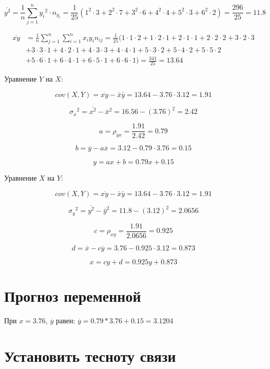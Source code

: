 $$\overline{y^2} = \frac{1}{n} \sum^{n}_{j=1}{{y_i}^2 \cdot n_{y_i}} = \frac{1}{25} (1^2 \cdot 3 + 2^2 \cdot 7 + 3^2 \cdot 6 + 4^2 \cdot 4 + 5^2 \cdot 3 + 6^2 \cdot 2) = \frac{296}{25} = 11.8$$

\begin{align*}
     \overline{xy} &= \frac{1}{n} \sum^{n}_{j=1} \sum^{n}_{i=1} x_i y_i n_{ij} = \frac{1}{25} (1 \cdot 1 \cdot 2 + 1 \cdot 2 \cdot 1 + 2 \cdot 1 \cdot 1 + 2 \cdot 2 \cdot 2 + 3 \cdot 2 \cdot 3 \nonumber \\
    &+ 3 \cdot 3 \cdot 1 + 4 \cdot 2 \cdot 1 + 4 \cdot 3 \cdot 3 + 4 \cdot 4 \cdot 1 + 5 \cdot 3 \cdot 2 + 5 \cdot 4 \cdot 2 + 5 \cdot 5 \cdot 2 \nonumber \\
    &+ 5 \cdot 6 \cdot 1 + 6 \cdot 4 \cdot 1 + 6 \cdot 5 \cdot 1 + 6 \cdot 6 \cdot 1) = \frac{341}{25} = 13.64
\end{align*}

Уравнение $Y$ на $X$:

$$cov(X, Y) = \overline{xy} - \bar{x} \bar{y} = 13.64 - 3.76 \cdot 3.12 = 1.91$$

$${\sigma_x}^2 = \overline{x^2} - \bar{x}^2 = 16.56 - (3.76)^2 = 2.42$$

$$a = \rho_{yx} = \frac{1.91}{2.42} = 0.79$$

$$b = \overline{y} - a \overline{x} = 3.12 - 0.79 \cdot 3.76 = 0.15$$

$$y = ax + b = 0.79x + 0.15$$

Уравнение $X$ на $Y$:

$$cov(X, Y) = \overline{xy} - \bar{x} \bar{y} = 13.64 - 3.76 \cdot 3.12 = 1.91$$

$${\sigma_y}^2 = \overline{y^2} - \bar{y}^2 = 11.8 - (3.12)^2 = 2.0656$$

$$c = \rho_{xy} = \frac{1.91}{2.0656} = 0.925$$

$$d = \overline{x} - c \overline{y} = 3.76 - 0.925 \cdot 3.12 = 0.873$$

$$x = cy + d = 0.925y + 0.873$$


\section{Прогноз переменной}

При $x=3.76$, $\overline{y}$ равен: $\overline{y} = 0.79 * 3.76 + 0.15 = 3.1204$

\section{Установить тесноту связи}

